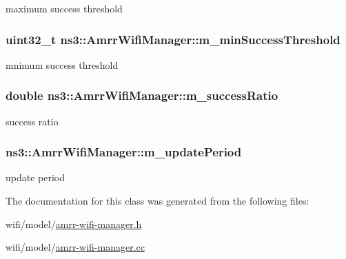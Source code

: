 maximum success threshold 

\subsubsection[{\texorpdfstring{m\+\_\+min\+Success\+Threshold}{m_minSuccessThreshold}}]{\setlength{\rightskip}{0pt plus 5cm}uint32\+\_\+t ns3\+::\+Amrr\+Wifi\+Manager\+::m\+\_\+min\+Success\+Threshold\hspace{0.3cm}{\ttfamily [private]}}\hypertarget{classns3_1_1AmrrWifiManager_a332a67b6b0cb14a3a4d410fda51c79c8}{}\label{classns3_1_1AmrrWifiManager_a332a67b6b0cb14a3a4d410fda51c79c8}


mnimum success threshold 

\subsubsection[{\texorpdfstring{m\+\_\+success\+Ratio}{m_successRatio}}]{\setlength{\rightskip}{0pt plus 5cm}double ns3\+::\+Amrr\+Wifi\+Manager\+::m\+\_\+success\+Ratio\hspace{0.3cm}{\ttfamily [private]}}\hypertarget{classns3_1_1AmrrWifiManager_af27c355d85f1a9971976a8e40b427856}{}\label{classns3_1_1AmrrWifiManager_af27c355d85f1a9971976a8e40b427856}


success ratio 

\subsubsection[{\texorpdfstring{m\+\_\+update\+Period}{m_updatePeriod}}]{ ns3\+::\+Amrr\+Wifi\+Manager\+::m\+\_\+update\+Period\hspace{0.3cm}{\ttfamily [private]}}\hypertarget{classns3_1_1AmrrWifiManager_aa32a0ec8a3a3a68adc568c32f110abec}{}\label{classns3_1_1AmrrWifiManager_aa32a0ec8a3a3a68adc568c32f110abec}


update period 



The documentation for this class was generated from the following files\+:\begin{DoxyCompactItemize}
\item 
wifi/model/\hyperlink{amrr-wifi-manager_8h}{amrr-\/wifi-\/manager.\+h}\item 
wifi/model/\hyperlink{amrr-wifi-manager_8cc}{amrr-\/wifi-\/manager.\+cc}\end{DoxyCompactItemize}
